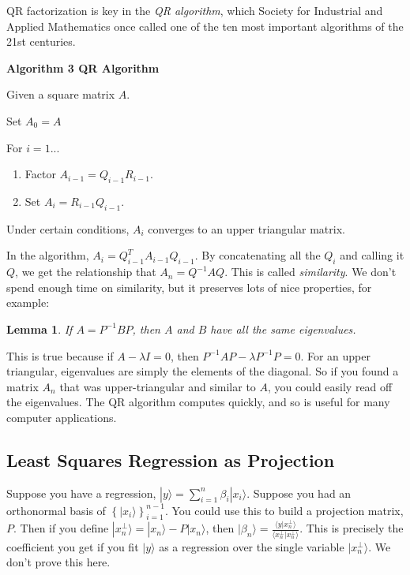 \documentclass{amsbook}
\newtheorem{lemma}[theorem]{Lemma}
\begin{document}
QR factorization is key in the {\em QR algorithm}, which Society for Industrial and Applied Mathematics once called one of the ten most important algorithms of the 21st centuries.

\begin{tcolorbox}[title=Algorithm 3: QR Algorithm,colback=blue!5]
  {\bfseries\Large Algorithm 3 QR Algorithm}\label{Algorithm1}

Given a square matrix $A$.

Set $A_0=A$

For $i=1...$
\begin{enumerate}
  \item Factor $A_{i-1}=Q_{i-1}R_{i-1}$.
  \item Set $A_i=R_{i-1}Q_{i-1}$.
\end{enumerate}

Under certain conditions, $A_i$ converges to an upper triangular matrix.
\end{tcolorbox}

In the algorithm, $A_i=Q_{i-1}^TA_{i-1}Q_{i-1}$.  By concatenating all the $Q_i$ and calling it $Q$, we get the relationship that $A_n=Q^{-1}AQ$.  This is called {\em similarity}.  We don't spend enough time on similarity, but it preserves lots of nice properties, for example:

\begin{lemma}
If $A=P^{-1}BP$, then $A$ and $B$ have all the same eigenvalues.
\end{lemma}

This is true because if $A-\lambda I=0$, then $P^{-1}AP-\lambda P^{-1}P=0$.  For an upper triangular, eigenvalues are simply the elements of the diagonal.  So if you found a matrix $A_n$ that was upper-triangular and similar to $A$, you could easily read off the eigenvalues.  The QR algorithm computes quickly, and so is useful for many computer applications.

\subsection{Least Squares Regression as Projection}

Suppose you have a regression, $|y\rangle=\sum_{i=1}^n\beta_i|x_i\rangle$.  Suppose you had an orthonormal basis of $\left\{|x_i\rangle\right\}_{i=1}^{n-1}$.  You could use this to build a projection matrix, $P$.  Then if you define $|x_n^\bot\rangle=|x_n\rangle-P|x_n\rangle$, then $|\beta_n\rangle=\frac{\langle y|x_n^\bot\rangle}{\langle x_n^\bot|x_n^\bot\rangle}$.  This is precisely the coefficient you get if you fit $|y\rangle$ as a regression over the single variable $|x_n^\bot\rangle$.  We don't prove this here.
\end{document}
